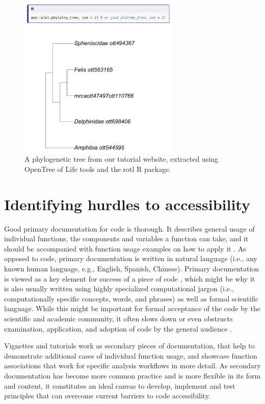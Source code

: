 \documentclass[12pt]{article}
\begin{document}
\begin{figure}
\begin{center}
\includegraphics[width=3in]{fig-tree.png}
\end{center}
\caption{A phylogenetic tree from our tutorial website, extracted using OpenTree of Life tools and the rotl R package. \label{fig:second}}
\end{figure}

\section*{Identifying hurdles to accessibility}
\label{sec:identifying}

Good primary documentation for code is thorough. It describes general usage of individual functions,
the components and variables a function can take, and it should be accompanied with
function usage examples on how to apply it \citep{karimzadeh2018top}.
As opposed to code, primary documentation is written in natural language (i.e.,
any known human language, e.g., English, Spanish, Chinese).
Primary documentation is viewed as a key element for success of a piece of code
\citep{karimzadeh2018top},
which might be why it is also usually written using highly specialized computational jargon (i.e., computationally specific concepts,
words, and phrases) as well as formal scientific language.
While this might be important for formal acceptance of the code by the scientific
and academic community, it often slows down or even
obstructs examination, application, and adoption of code by the general audience \citep{ball2017its}.

Vignettes and tutorials work as secondary pieces of documentation, that help to demonstrate
additional cases of individual function usage, and showcase function associations
that work for specific analysis workflows in more detail.
As secondary documentation has become more common practice and is more flexible
in its form and content, it constitutes an ideal canvas to develop, implement and
test principles that can overcome current barriers to code accessibility.
\end{document}
